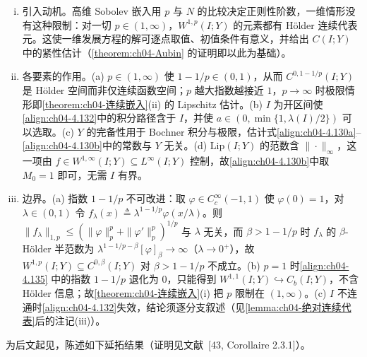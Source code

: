 \documentclass[../../main.tex]{subfiles}%
\begin{document}
\begin{remark}\label{remark:ch04-连续嵌入动机}
\begin{enumerate}[(i)]
\item 引入动机。高维 Sobolev 嵌入用 $p$ 与 $N$ 的比较决定正则性阶数，一维情形没有这种限制：对一切 $p\in(1,\infty)$，$W^{1,p}(I;Y)$ 的元素都有 Hölder 连续代表元。这使一维发展方程的解可逐点取值、初值条件有意义，并给出 $C(I;Y)$ 中的紧性估计（\cref{theorem:ch04-Aubin} 的证明即以此为基础）。

\item 各要素的作用。(a) $p\in(1,\infty)$ 使 $1-1/p\in(0,1)$，从而 $C^{0,1-1/p}(I;Y)$ 是 Hölder 空间而非仅连续函数空间；$p$ 越大指数越接近 $1$，$p\to\infty$ 时极限情形即\cref{theorem:ch04-连续嵌入}(ii) 的 Lipschitz 估计。(b) $I$ 为开区间使\eqref{align:ch04-4.132}中的积分路径含于 $I$，并使 $a\in(0,\min\{1,\lambda(I)/2\})$ 可以选取。(c) $Y$ 的完备性用于 Bochner 积分与极限，估计式\eqref{align:ch04-4.130a}--\eqref{align:ch04-4.130b}中的常数与 $Y$ 无关。(d) $\mathrm{Lip}(I;Y)$ 的范数含 $\|\cdot\|_\infty$，这一项由 $f\in W^{1,\infty}(I;Y)\subseteq L^\infty(I;Y)$ 控制，故\eqref{align:ch04-4.130b}中取 $M_0=1$ 即可，无需 $I$ 有界。

\item 边界。(a) 指数 $1-1/p$ 不可改进：取 $\varphi\in C_c^\infty(-1,1)$ 使 $\varphi(0)=1$，对 $\lambda\in(0,1)$ 令 $f_\lambda(x)\triangleq\lambda^{1-1/p}\varphi(x/\lambda)$。则 $\|f_\lambda\|_{1,p}\leqslant(\|\varphi\|_p^p+\|\varphi'\|_p^p)^{1/p}$ 与 $\lambda$ 无关，而 $\beta>1-1/p$ 时 $f_\lambda$ 的 $\beta$-Hölder 半范数为 $\lambda^{1-1/p-\beta}[\varphi]_\beta\to\infty$（$\lambda\to0^+$），故 $W^{1,p}(I;Y)\subseteq C^{0,\beta}(I;Y)$ 对 $\beta>1-1/p$ 不成立。(b) $p=1$ 时\eqref{align:ch04-4.135} 中的指数 $1-1/p$ 退化为 $0$，只能得到 $W^{1,1}(I;Y)\hookrightarrow C_b(I;Y)$，不含 Hölder 信息；故\cref{theorem:ch04-连续嵌入}(i) 把 $p$ 限制在 $(1,\infty)$。(c) $I$ 不连通时\eqref{align:ch04-4.132}失效，结论须逐分支叙述（见\cref{lemma:ch04-绝对连续代表}后的注记(iii)）。
\end{enumerate}
\end{remark}

为后文起见，陈述如下延拓结果（证明见文献~[43, Corollaire 2.3.1]）。
\end{document}

